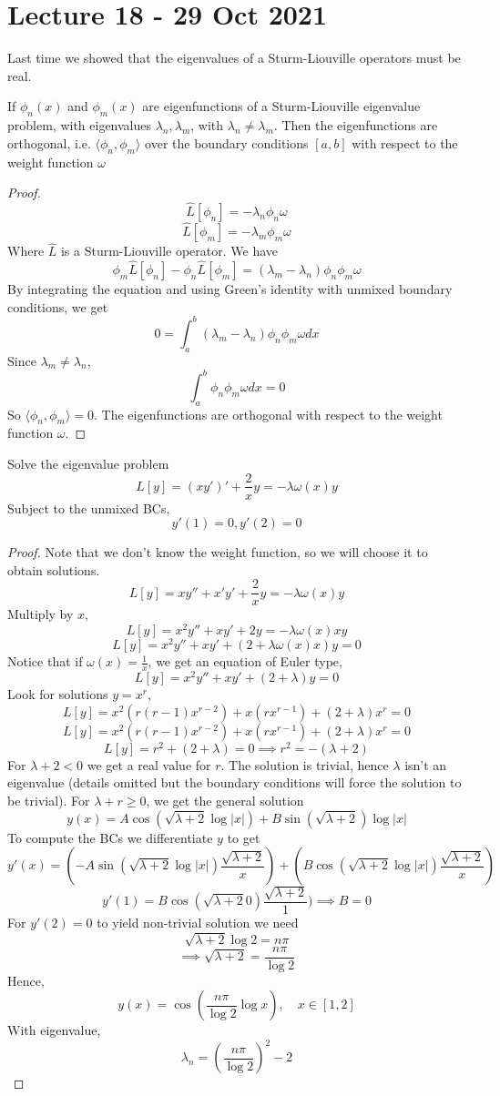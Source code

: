 \section{Lecture 18 - 29 Oct 2021}
Last time we showed that the eigenvalues of a Sturm-Liouville operators must be real.
\begin{theorem}
  If $\phi_n(x)$ and $\phi_m(x)$ are eigenfunctions of a Sturm-Liouville eigenvalue
  problem, with eigenvalues $\lambda_n, \lambda_m$, with $\lambda_n\neq \lambda_m$. Then
  the eigenfunctions are orthogonal, i.e. $\langle \phi_n, \phi_m \rangle$ over the
  boundary conditions $[a,b]$ with respect to the weight function $\omega$
\end{theorem}
\begin{proof}
  \[\hat{L}[\phi_n]=-\lambda_n\phi_n\omega\]
  \[\hat{L}[\phi_m]=-\lambda_m\phi_m\omega\]
  Where $\hat{L}$ is a Sturm-Liouville operator. We have
  \[\phi_m\hat{L}[\phi_n]-\phi_n\hat{L}[\phi_m]=(\lambda_m-\lambda_n)\phi_n\phi_m\omega\]
  By integrating the equation and using Green's identity with unmixed boundary conditions,
  we get
  \[0=\int_a^b (\lambda_m-\lambda_n)\phi_n\phi_m\omega dx\]
  Since $\lambda_m\neq \lambda_n$, 
  \[\int_a^b \phi_n\phi_m\omega dx=0\]
  So $\langle \phi_n, \phi_m \rangle =0$. The eigenfunctions are orthogonal with respect
  to the weight function $\omega$.
\end{proof}

\begin{example}
  Solve the eigenvalue problem
  \[L[y]=(xy')'+\frac{2}{x}y=-\lambda\omega(x)y\]
  Subject to the unmixed BCs,
  \[y'(1)=0, y'(2)=0\]
\end{example}
\begin{proof}
  Note that we don't know the weight function, so we will choose it to obtain solutions.
  \[L[y]=xy''+x'y' +\frac{2}{x}y=-\lambda\omega(x)y\]
  Multiply by $x$,
  \[L[y]=x^2y''+xy' +2y=-\lambda\omega(x)x y\]
  \[L[y]=x^2y''+xy' + (2+\lambda\omega(x)x )y=0\]
  Notice that if $\omega(x)=\frac{1}{x}$, we get an equation of Euler type,
  \[L[y]=x^2y''+xy' + (2+\lambda )y=0\]
  Look for solutions $y=x^r$,
  \[L[y]=x^2(r(r-1)x^{r-2})+x(rx^{r-1}) + (2+\lambda )x^{r}=0\]
  \[L[y]=x^2(r(r-1)x^{r-2})+x(rx^{r-1}) + (2+\lambda )x^{r}=0\]
  \[L[y]=r^2+(2+\lambda)=0 \implies r^2=-(\lambda+2)\]
  For $\lambda+2<0$ we get a real value for $r$. The solution is trivial, hence
  $\lambda$ isn't an eigenvalue (details omitted but the boundary conditions will force
  the solution to be trivial). For $\lambda+r\geq 0$, we get the general solution
  \[y(x)=A\cos(\sqrt{\lambda+2}\log |x|)+B\sin(\sqrt{\lambda+2})\log|x|\]
  To compute the BCs we differentiate $y$ to get
  \[y'(x)=(-A\sin(\sqrt{\lambda+2}\log |x|) \frac{\sqrt{\lambda+2}}{x} ) +
  (B\cos(\sqrt{\lambda+2}\log |x|) \frac{\sqrt{\lambda+2}}{x})\]
  \[y'(1)= B \cos (\sqrt{\lambda+2} 0) \frac{\sqrt{\lambda+2}}{1})\implies B=0\]
  For $y'(2)=0$ to yield non-trivial solution we need
  \[\sqrt{\lambda+2}\log 2=n\pi\]
  \[\implies \sqrt{\lambda+2}=\frac{n\pi}{\log 2}\]
  Hence,
  \[y(x)=\cos(\frac{n\pi}{\log 2}\log x), \quad x\in[1,2]\]
  With eigenvalue,
  \[\lambda_n = \left( \frac{n\pi}{\log 2} \right)^2-2\]
\end{proof}

